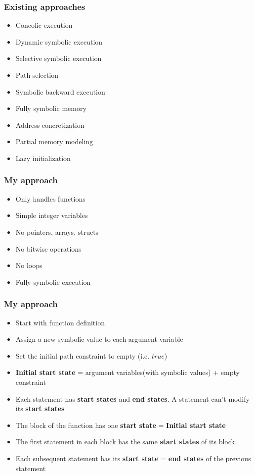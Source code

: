 \documentclass{beamer}
\begin{document}
\begin{frame}[fragile]
\frametitle{Existing approaches}
\begin{itemize}
\item Concolic execution
\item Dynamic symbolic execution
\item Selective symbolic execution
\item Path selection
\item Symbolic backward execution
\item Fully symbolic memory
\item Address concretization
\item Partial memory modeling
\item Lazy initialization

\end{itemize}
\end{frame}

\begin{frame}[fragile]
\frametitle{My approach}
\begin{itemize}
\item Only handles functions
\item Simple integer variables
\item No pointers, arrays, structs 
\item No bitwise operations
\item No loops
\item Fully symbolic execution
\end{itemize}
\end{frame}

\begin{frame}[fragile]
\frametitle{My approach}
\begin{itemize}
\item Start with function definition
\item Assign a new symbolic value to each argument variable
\item Set the initial path constraint to empty (i.e. $true$)
\item \textbf{Initial start state} = argument variables(with symbolic values) + empty constraint
\item Each statement has \textbf{start states} and \textbf{end states}. A statement can't modify its \textbf{start states}

\item The block of the function has one \textbf{start state} = \textbf{Initial start state}

\item The first statement in each block has the same \textbf{start states} of its block

\item Each subsequent statement has its \textbf{start state} =  \textbf{end states} of the previous statement
\end{itemize}
\end{frame}
\end{document}
